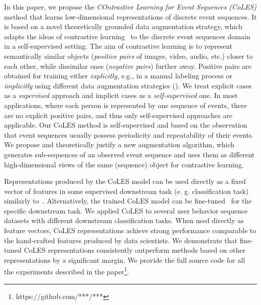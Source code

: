 \documentclass[sigconf]{acmart}
\begin{document}
In this paper, we propose the \emph{COntrastive Learning for Event Sequences (CoLES)} method that learns low-dimensional representations of discrete event sequences. It is based on a novel theoretically grounded data augmentation strategy, which adapts the ideas of contrastive learning~\citep{Xing2002DistanceML, Hadsell2006DimensionalityRB} to the discrete event sequences domain in a self-supervised setting.
The aim of contrastive learning is to represent semantically similar objects (\textit{positive pairs} of images, video, audio, etc.) closer to each other, while dissimilar ones (\textit{negative pairs}) further away. Positive pairs are obtained for training either {\it explicitly}, e.g., in a manual labeling process or {\it implicitly} using different data augmentation strategies (\cite{Falcon2020AFF}). We treat explicit cases as a {\it supervised} approach and implicit cases as a {\it self-supervised} one. In most applications, where each person is represented by one sequence of events, there are no explicit positive pairs, and thus only self-supervised approaches are applicable. Our CoLES method is self-supervised and based on the observation that event sequences usually possess periodicity and repeatability of their events. We propose and theoretically justify a new augmentation algorithm, which generates sub-sequences of an observed event sequence and uses them as different high-dimensional 
views of the same (sequence) object for contrastive learning.

Representations produced by the CoLES model can be used directly as a fixed vector of features in some supervised downstream task (e. g. classification task) similarly to~\citep{Mikolov2013EfficientEO, Song2017LearningUE, Zhai2019LearningAU}. Alternatively, the trained CoLES model can be fine-tuned~\citep{Devlin2019BERTPO} for the specific downstream task.
We applied CoLES to several user behavior sequence datasets with different downstream classification tasks. When used directly as feature vectors, CoLES representations achieve strong performance comparable to the hand-crafted features produced by data scientists.
We demonstrate that fine-tuned CoLES representations consistently outperform methods based on other representations by a significant margin. %
We provide the full source code for all the experiments described in the paper\footnote{https://github.com/***/***}.
\end{document}
